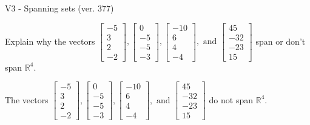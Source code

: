 \begin{exercise}
  \begin{exerciseTitle}V3 - Spanning sets (ver. 377)\end{exerciseTitle}
  \begin{exerciseStatement}
    Explain why the vectors \(\left[\begin{array}{r}
-5 \\
3 \\
2 \\
-2
\end{array}\right] , \left[\begin{array}{r}
0 \\
-5 \\
-5 \\
-3
\end{array}\right] , \left[\begin{array}{r}
-10 \\
6 \\
4 \\
-4
\end{array}\right] , \text{ and } \left[\begin{array}{r}
45 \\
-32 \\
-23 \\
15
\end{array}\right]\) span or don't span \(\mathbb{R}^4\). 
	


  \end{exerciseStatement}
  \begin{exerciseAnswer}
   The vectors \(\left[\begin{array}{r}
-5 \\
3 \\
2 \\
-2
\end{array}\right] , \left[\begin{array}{r}
0 \\
-5 \\
-5 \\
-3
\end{array}\right] , \left[\begin{array}{r}
-10 \\
6 \\
4 \\
-4
\end{array}\right] , \text{ and } \left[\begin{array}{r}
45 \\
-32 \\
-23 \\
15
\end{array}\right]\) 
  	 do not  
	span \(\mathbb{R}^4\).
  


  \end{exerciseAnswer}
\end{exercise}